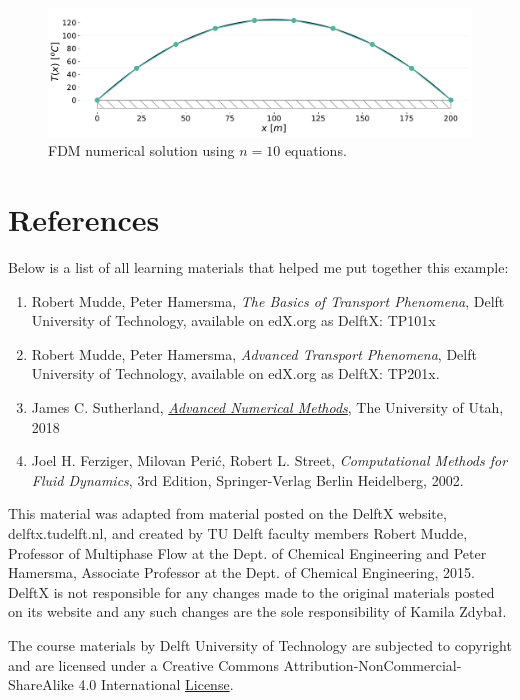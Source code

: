 \begin{figure}[H]
\centering\includegraphics[width=12cm]{figures/example-heat-transfer-in-a-rod-FDM-n10.pdf}
\caption{FDM numerical solution using $n=10$ equations.}
\label{fig:FDM-solution}
\end{figure}

\newpage

\section{References}

Below is a list of all learning materials that helped me put together this example:

\begin{enumerate}
\item Robert Mudde, Peter Hamersma, \textit{The Basics of Transport Phenomena}, Delft University of Technology, available on edX.org as DelftX: TP101x
\item Robert Mudde, Peter Hamersma, \textit{Advanced Transport Phenomena}, Delft University of Technology, available on edX.org as DelftX: TP201x.
\item James C. Sutherland, \textit{\href{https://sutherland.che.utah.edu/teaching/chen6703/lectures-schedule/}{Advanced Numerical Methods}}, The University of Utah, 2018
\item Joel H. Ferziger, Milovan Perić, Robert L. Street, \textit{Computational Methods for Fluid Dynamics}, 3rd Edition, Springer-Verlag Berlin Heidelberg, 2002.
\end{enumerate}

This material was adapted from material posted on the DelftX website, delftx.tudelft.nl, and created by TU Delft faculty members Robert Mudde, Professor of Multiphase Flow at the Dept. of Chemical Engineering and Peter Hamersma, Associate Professor at the Dept. of Chemical Engineering, 2015. DelftX is not responsible for any changes made to the original materials posted on its website and any such changes are the sole responsibility of Kamila Zdybał.

The course materials by Delft University of Technology are subjected to copyright and are licensed under a Creative Commons Attribution-NonCommercial-ShareAlike 4.0 International \href{https://creativecommons.org/licenses/by-nc-sa/4.0/}{License}.
